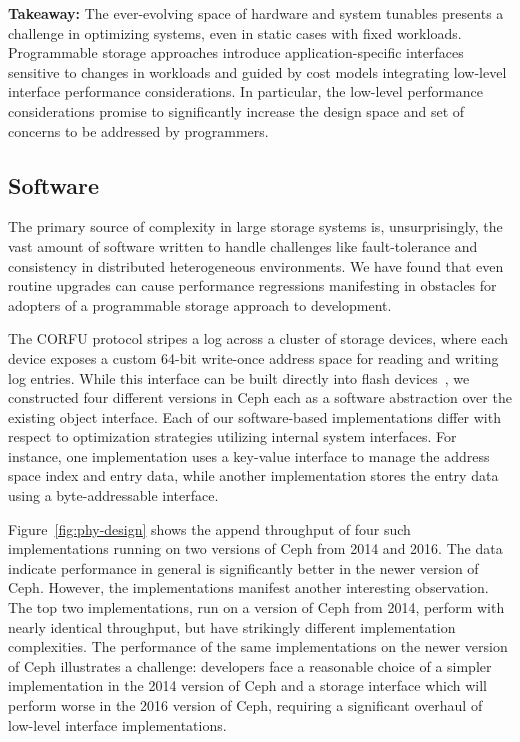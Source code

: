 \textbf{Takeaway:} The ever-evolving space of hardware and system tunables presents a challenge
in optimizing systems, even in static cases with fixed workloads. Programmable
storage approaches introduce application-specific interfaces sensitive to changes in workloads and 
guided by cost models integrating low-level interface performance considerations.
In particular, the low-level performance considerations promise to significantly increase the design space and set of
concerns to be addressed by programmers.

\subsection{Software}

The primary source of complexity in large storage systems is, unsurprisingly,
the vast amount of software written to handle challenges like fault-tolerance
and consistency in distributed heterogeneous environments. We have found that
even routine upgrades can cause performance regressions manifesting in obstacles 
for adopters of a programmable storage approach to development.

The CORFU protocol stripes a log across a cluster of storage
devices, where each device exposes a custom 64-bit write-once address space for reading
and writing log entries. While this interface can be built directly into flash
devices~\cite{wei:systor13}, we constructed four different versions in Ceph
each as a software abstraction over the existing object interface.
Each of our software-based implementations differ with respect to optimization
strategies utilizing internal system interfaces. For instance, one
implementation uses a key-value interface to manage the address space index
and entry data, while another implementation stores the entry data using a
byte-addressable interface. 

Figure~\ref{fig:phy-design} shows the append throughput of four such
implementations running on two versions of Ceph from 2014 and 2016. The data indicate 
performance in general is significantly better in the newer version of Ceph. 
However, the implementations manifest another interesting observation. The top two
implementations, run on a version of Ceph from 2014, perform with nearly identical throughput, 
but have strikingly different implementation complexities. The performance of the same
implementations on the newer version of Ceph illustrates a challenge: developers face a
reasonable choice of a simpler implementation in the 2014 version of Ceph and a storage interface
which will perform worse in the 2016 version of Ceph, requiring a significant overhaul of low-level
interface implementations.

